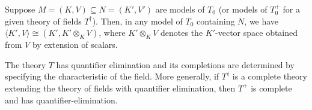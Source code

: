 \documentclass[10pt,a4paper]{amsart}
\begin{document}
\begin{lem} \label{extension of scalars}
    Suppose $M =(K,V) \subseteq N=(K',V')$ are models of $T_{0}$ (or models of $T_{0}^{+}$ for a given theory of fields $T^{\dagger}$).  Then, in any model of $T_0$ containing $N$, we have $\langle K',V\rangle \cong (K', K' \otimes_{K} V)$, where $K' \otimes_{K} V$ denotes the $K'$-vector space obtained from $V$ by extension of scalars. 
\end{lem}

\begin{lem}
    The theory $T$ has quantifier elimination and its completions are determined by specifying the characteristic of the field.  More generally, if $T^{\dagger}$ is a complete theory extending the theory of fields with quantifier elimination, then $T^{+}$ is complete and has quantifier-elimination.  
\end{lem}
\end{document}
